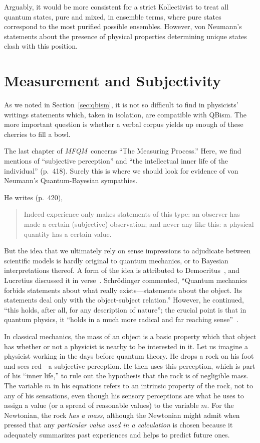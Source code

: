 \documentclass[aps,pra,superscriptaddress,12pt,tightenlines,nofootinbib]{revtex4-2}
\newcommand{\MFQM}{\textsl{MFQM}}
\begin{document}
Arguably, it would be more consistent for a strict Kollectivist to
treat all quantum states, pure and mixed, in ensemble terms, where
pure states correspond to the most purified possible ensembles.
However, von Neumann's statements about the presence of physical
properties determining unique states clash with this position.


\section{Measurement and Subjectivity}

As we noted in Section~\ref{sec:qbism}, it is not so difficult to find
in physicists' writings statements which, taken in isolation, are
compatible with QBism.  The more important question is whether a
verbal corpus yields up enough of these cherries to fill a bowl.

The last chapter of \MFQM\ concerns ``The Measuring Process.''  Here,
we find mentions of ``subjective perception'' and ``the intellectual
inner life of the individual'' (p.\ 418).  Surely this is where we
should look for evidence of von Neumann's Quantum-Bayesian
sympathies.  

He writes (p.\ 420),
\begin{quotation}
\noindent Indeed experience only makes statements of this type: an
observer has made a certain (subjective) observation; and never any
like this: a physical quantity has a certain value.
\end{quotation}
But the idea that we ultimately rely on sense impressions to
adjudicate between scientific models is hardly original to quantum
mechanics, or to Bayesian interpretations thereof.  A form of the idea
is attributed to Democritus~\cite{DK68B9}, and Lucretius discussed it
in verse~\cite{Lucretius}.  Schr\"odinger commented, ``Quantum
mechanics forbids statements about what really exists---statements
about the object. Its statements deal only with the object-subject
relation.''  However, he continued, ``this holds, after all, for any
description of nature''; the crucial point is that in quantum physics,
it ``holds in a much more radical and far reaching sense''~\cite{AJP}.

In classical mechanics, the mass of an object is a basic property
which that object has whether or not a physicist is nearby to be
interested in it.  Let us imagine a physicist working in the days
before quantum theory.  He drops a rock on his foot and sees red---a
subjective perception.  He then uses this perception, which is part of
his ``inner life,'' to rule out the hypothesis that the rock is of
negligible mass.  The variable $m$ in his equations refers to an
intrinsic property of the rock, not to any of his sensations, even
though his sensory perceptions are what he uses to assign a value (or
a spread of reasonable values) to the variable $m$.  For the
Newtonian, the rock \emph{has a mass,} although the Newtonian might
admit when pressed that any \emph{particular value used in a
  calculation} is chosen because it adequately summarizes past
experiences and helps to predict future ones.
\end{document}
